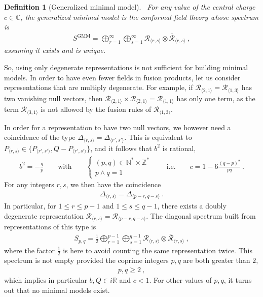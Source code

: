 \documentclass[12pt, a4paper]{article}
\theoremstyle{break}
\newtheorem{defn}[exo]{Definition}
\begin{document}
\begin{defn}[Generalized minimal model]
 ~\label{def:gmm}
 For any value of the central charge $c\in\mathbb{C}$, the generalized minimal model is the conformal field theory whose spectrum is
 \begin{align}
  S^\mathrm{GMM} = \bigoplus_{r=1}^\infty \bigoplus_{s=1}^\infty \mathcal{R}_{\langle r,s \rangle}\otimes  \mathcal{\bar R}_{\langle r,s \rangle} \ ,
 \end{align}
 assuming it exists and is unique.
\end{defn}

So, using only degenerate representations is not sufficient for building minimal models.
In order to have even fewer fields in fusion products, let us consider representations that are multiply degenerate. For example, if $\mathcal{R}_{\langle 2, 1\rangle} = \mathcal{R}_{\langle 1, 3\rangle}$ has two vanishing null vectors, then $\mathcal{R}_{\langle 2, 1\rangle} \times \mathcal{R}_{\langle 2, 1\rangle} = \mathcal{R}_{\langle 1,1\rangle}$ has only one term, as the term $\mathcal{R}_{\langle 3, 1\rangle}$ is not allowed by the fusion rules of $\mathcal{R}_{\langle 1, 3\rangle}$.

In order for a representation to have two null vectors, we however need a coincidence of 
the type $\Delta_{\langle r,s \rangle} = \Delta_{\langle r',s' \rangle}$. 
This is equivalent to $P_{\langle r,s \rangle} \in \{ P_{\langle r',s' \rangle}, Q-P_{\langle r',s' \rangle}\}$, and it follows that
$b^2$ is rational,
\begin{align} 
 b^2 = - \frac{q}{p} \qquad \text{with} \qquad \left\{\begin{array}{l} (p,q)\in \mathbb{N}^*\times \mathbb{Z}^* \\ p\wedge q = 1 \end{array} \right. 
 \qquad \text{i.e.} \qquad c = 1-6\frac{(q-p)^2}{pq}\ .
 \label{eq:bcmin}
\end{align}
For any integers $r,s$, we then have the coincidence 
\begin{align}
 \Delta_{\langle r,s \rangle} = \Delta_{\langle p-r, q-s\rangle}\ .
\end{align}
In particular, for $1\leq r\leq p-1$ and $1\leq s\leq q-1$, there exists a doubly degenerate representation $\mathcal{R}_{\langle r, s\rangle} = \mathcal{R}_{\langle p-r, q-s\rangle}$. The diagonal spectrum built from representations of this type is 
\begin{align}
 S_{p, q} = \frac12 \bigoplus_{r=1}^{p-1} \bigoplus_{s=1}^{q-1} \mathcal{R}_{\langle r,s \rangle}\otimes \mathcal{\bar{R}}_{\langle r,s \rangle}\ ,
\end{align}
where the factor $\frac12$ is here to avoid counting the same representation twice. This spectrum is not empty provided the coprime integers $p,q$ are both greater than $2$,
\begin{align}
 p,q \geq 2 \ ,
 \label{eq:pqmin}
\end{align}
which implies in particular $b,Q\in i\mathbb{R}$ and $c<1$.
For other values of $p,q$, it turns out that no minimal models exist.
\end{document}
